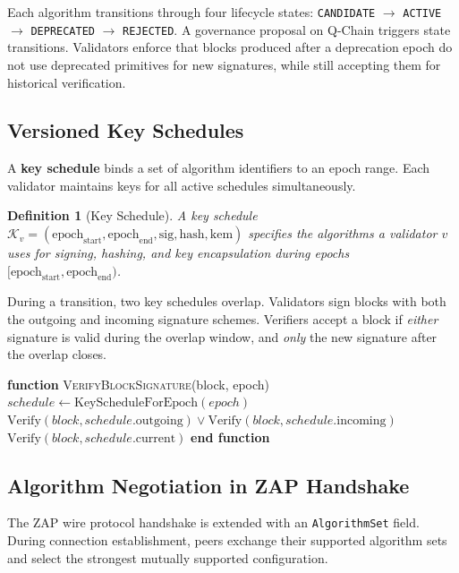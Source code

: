 \documentclass[11pt]{article}
\newtheorem{definition}{Definition}
\begin{document}
Each algorithm transitions through four lifecycle states: \texttt{CANDIDATE} $\to$ \texttt{ACTIVE} $\to$ \texttt{DEPRECATED} $\to$ \texttt{REJECTED}. A governance proposal on Q-Chain triggers state transitions. Validators enforce that blocks produced after a deprecation epoch do not use deprecated primitives for new signatures, while still accepting them for historical verification.

\subsection{Versioned Key Schedules}

A \textbf{key schedule} binds a set of algorithm identifiers to an epoch range. Each validator maintains keys for all active schedules simultaneously.

\begin{definition}[Key Schedule]
A key schedule $\mathcal{K}_v = (\text{epoch}_{\text{start}}, \text{epoch}_{\text{end}}, \text{sig}, \text{hash}, \text{kem})$ specifies the algorithms a validator $v$ uses for signing, hashing, and key encapsulation during epochs $[\text{epoch}_{\text{start}}, \text{epoch}_{\text{end}})$.
\end{definition}

During a transition, two key schedules overlap. Validators sign blocks with both the outgoing and incoming signature schemes. Verifiers accept a block if \emph{either} signature is valid during the overlap window, and \emph{only} the new signature after the overlap closes.

\begin{algorithmic}[1]
\State \textbf{function} \textsc{VerifyBlockSignature}(block, epoch)
\State $schedule \gets \text{KeyScheduleForEpoch}(epoch)$
    \State \Return $\text{Verify}(block, schedule.\text{outgoing}) \lor \text{Verify}(block, schedule.\text{incoming})$
\Else
    \State \Return $\text{Verify}(block, schedule.\text{current})$
\EndIf
\State \textbf{end function}
\end{algorithmic}

\subsection{Algorithm Negotiation in ZAP Handshake}

The ZAP wire protocol \cite{zap-wire} handshake is extended with an \texttt{AlgorithmSet} field. During connection establishment, peers exchange their supported algorithm sets and select the strongest mutually supported configuration.
\end{document}
